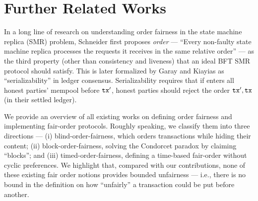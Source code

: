 \section{Further Related Works}
\label{sec:further-related-works}

In a long line of research on understanding order fairness in the state machine replica (SMR) problem, Schneider \cite{CSUR:Schneider90} first proposes \emph{order} --- ``Every non-faulty state machine replica processes the requests it receives in the same relative order'' --- as the third property (other than consistency and liveness) that an ideal BFT SMR protocol should satisfy.
%
This is later formalized by Garay and Kiayias \cite{RSA:GarKia20} as ``serializability'' in ledger consensus.
%
Serializability requires that if \tx enters all honest parties' mempool before $\mathtt{tx}'$, honest parties should reject the order $\mathtt{tx}', \mathtt{tx}$ (in their settled ledger).

We provide an overview of all existing works on defining order fairness and implementing fair-order protocols.
%
Roughly speaking, we classify them into three directions --- (i) blind-order-fairness, which orders transactions while hiding their content; (ii) block-order-fairness, solving the Condorcet paradox by claiming ``blocks''; and (iii) timed-order-fairness, defining a time-based fair-order without cyclic preferences.
%
We highlight that, compared with our contributions, none of these existing fair order notions provides bounded unfairness --- i.e., there is no bound in the definition on how ``unfairly'' a transaction could be put before another.




